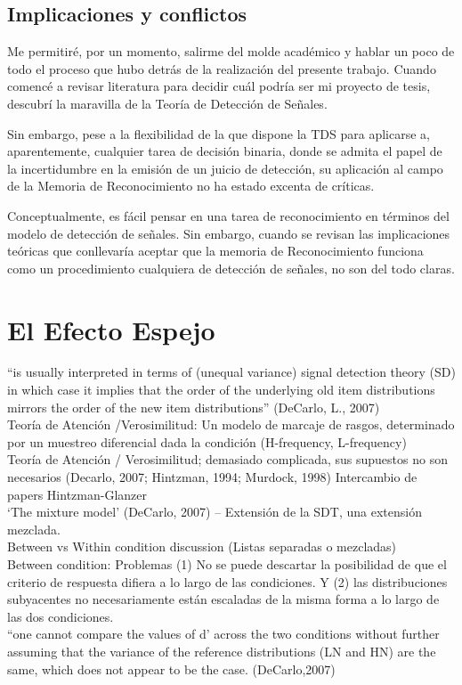 \subsection{Implicaciones y conflictos}

Me permitiré, por un momento, salirme del molde académico y hablar un poco de todo el proceso que hubo detrás de la realización del presente trabajo. Cuando comencé a revisar literatura para decidir cuál podría ser mi proyecto de tesis, descubrí la maravilla de la Teoría de Detección de Señales. 

Sin embargo, pese a la flexibilidad de la que dispone la TDS para aplicarse a, aparentemente, cualquier tarea de decisión binaria, donde se admita el papel de la incertidumbre en la emisión de un juicio de detección, su aplicación al campo de la Memoria de Reconocimiento no ha estado excenta de críticas.

Conceptualmente, es fácil pensar en una tarea de reconocimiento en términos del modelo de detección de señales. Sin embargo, cuando se revisan las implicaciones teóricas que conllevaría aceptar que la memoria de Reconocimiento funciona como un procedimiento cualquiera de detección de señales, no son del todo claras. 

\section{El Efecto Espejo}

“is usually interpreted in terms of (unequal variance) signal detection theory (SD) in which case it implies that the order of the underlying old item distributions mirrors the order of the new item distributions” (DeCarlo, L.,  2007)\\
Teoría de Atención /Verosimilitud: Un modelo de marcaje de rasgos, determinado por un muestreo diferencial dada la condición (H-frequency, L-frequency)\\
Teoría de Atención / Verosimilitud; demasiado complicada, sus supuestos no son necesarios (Decarlo, 2007; Hintzman, 1994; Murdock, 1998) Intercambio de papers Hintzman-Glanzer\\
‘The mixture model’ (DeCarlo, 2007) – Extensión de la SDT, una extensión mezclada.\\
Between vs Within condition discussion (Listas separadas o mezcladas)\\
Between condition: Problemas (1) No se puede descartar la posibilidad de que el criterio de respuesta difiera a lo largo de las condiciones. Y (2) las distribuciones subyacentes no necesariamente están escaladas de la misma forma a lo largo de las dos condiciones.\\
“one cannot compare the values of d’ across the two conditions without further assuming that the variance of the reference distributions (LN and HN) are the same, which does not appear to be the case. (DeCarlo,2007)  

